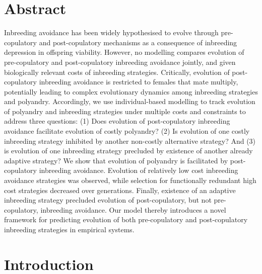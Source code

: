 \documentclass[10pt,letterpaper]{article}
\begin{document}
\section*{Abstract}
Inbreeding avoidance has been widely hypothesised to evolve through pre-copulatory and post-copulatory mechanisms as a consequence of inbreeding depression in offspring viability. However, no modelling compares evolution of pre-copulatory and post-copulatory inbreeding avoidance jointly, and given biologically relevant costs of inbreeding strategies. Critically, evolution of post-copulatory inbreeding avoidance is restricted to females that mate multiply, potentially leading to complex evolutionary dynamics among inbreeding strategies and polyandry. Accordingly, we use individual-based modelling to track evolution of polyandry and inbreeding strategies under multiple costs and constraints to address three questions: (1) Does evolution of post-copulatory inbreeding avoidance facilitate evolution of costly polyandry? (2) Is evolution of one costly inbreeding strategy inhibited by another non-costly alternative strategy? And (3) is evolution of one inbreeding strategy precluded by existence of another already adaptive strategy? We show that evolution of polyandry is facilitated by post-copulatory inbreeding avoidance. Evolution of relatively low cost inbreeding avoidance strategies was observed, while selection for functionally redundant high cost strategies decreased over generations. Finally, existence of an adaptive inbreeding strategy precluded evolution of post-copulatory, but not pre-copulatory, inbreeding avoidance. Our model thereby introduces a novel framework for predicting evolution of both pre-copulatory and post-copulatory inbreeding strategies in empirical systems.

\section*{Introduction}
\end{document}
